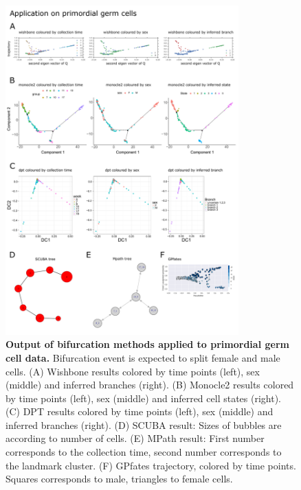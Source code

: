 \begin{figure}
    \centering
    \includegraphics[width=0.8\textwidth]{"results_pgc"}
    \caption[Output of bifurcation methods applied to primordial germ cell data]{\textbf{Output of bifurcation methods applied to primordial germ cell data.} Bifurcation event is expected to split female and male cells. (A) Wishbone results colored by time points (left), sex (middle) and inferred branches (right). (B) Monocle2 results colored by time points (left), sex (middle) and inferred cell states (right). (C) DPT results colored by time points (left), sex (middle) and inferred branches (right). (D) SCUBA result: Sizes of bubbles are according to number of cells. (E) MPath result: First number corresponds to the collection time, second number corresponds to the landmark cluster. (F) GPfates trajectory, colored by time points. Squares corresponds to male, triangles to female cells.}
    \label{fig:res_pgc}
\end{figure}

